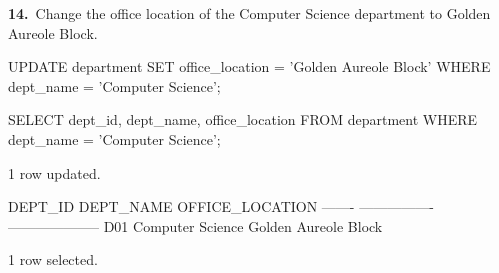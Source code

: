 \noindent\begin{minipage}{\linewidth}
\begingroup{}
{\fontsize{14}{17}\selectfont\textbf{14.}}\ Change the office location of the Computer Science department to Golden Aureole Block.\par
\endgroup\vspace{12pt}


\begin{sqlcode}[fontsize=\footnotesize]
UPDATE department SET office_location = 'Golden Aureole Block'
WHERE dept_name = 'Computer Science';

SELECT dept_id, dept_name, office_location FROM department
WHERE dept_name = 'Computer Science';
\end{sqlcode}

\vspace{18pt}


\begin{sqlout}[fontsize=\small]
1 row updated.

DEPT_ID  DEPT_NAME         OFFICE_LOCATION     
-------  ----------------  --------------------
D01      Computer Science  Golden Aureole Block

1 row selected.
\end{sqlout}
\end{minipage}\par\vspace{24pt}


